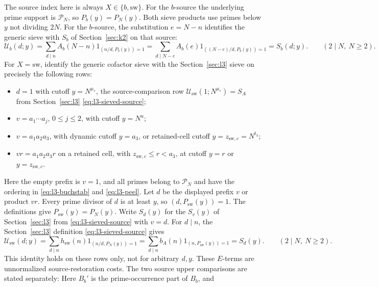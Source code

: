 The source index here is always \(X\in\{b,\mathrm{sw}\}\).
For the $b$-source the underlying prime support is \(\mathcal P_N\), so
\(P_b(y)=P_N(y)\). Both sieve products use primes below $y$ not dividing
$2N$.
For the \(b\)-source, the substitution \(e=N-n\) identifies the
generic sieve with \(S_b\) of Section~\ref{sec:k2} on that source:
\begin{equation}\label{eq:source-ch07-sieve-bridge}
 \mathscr U_b(d;y)
 =\sum_{d\mid n}A_b(N-n)1_{(n/d,P_b(y))=1}
 =\sum_{d\mid N-e}A_b(e)1_{((N-e)/d,P_b(y))=1}
 =S_b(d;y).
\qquad(2\mid N,\ N\ge2).
\end{equation}
For \(X=\mathrm{sw}\), identify the generic cofactor sieve with the
Section~\ref{sec:l3} sieve on precisely the following rows:
\begin{itemize}
\item \(d=1\) with cutoff \(y=N^{\mu_*}\), the source-comparison row
\(\mathscr U_{\mathrm{sw}}(1;N^{\mu_*})=S_A\) from Section~\ref{sec:l3}
\eqref{eq:l3-sieved-source};
\item \(v=a_1\cdots a_j\), \(0\le j\le2\), with cutoff \(y=N^u\);
\item \(v=a_1a_2a_3\), with dynamic cutoff \(y=a_3\), or retained-cell
cutoff \(y=z_{\mathrm{sw},c}=N^{t_3}\);
\item \(vr=a_1a_2a_3r\) on a retained cell, with
\(z_{\mathrm{sw},c}\le r<a_3\), at cutoff \(y=r\) or
\(y=z_{\mathrm{sw},c}\).
\end{itemize}
Here the empty prefix is \(v=1\), and all primes belong to
\(\mathcal P_N\) and have the ordering in \eqref{eq:l3-buchstab}
and \eqref{eq:l3-peel}. Let \(d\) be the displayed prefix \(v\) or
product \(vr\). Every prime divisor of \(d\) is at least \(y\), so
\((d,P_{\mathrm{sw}}(y))=1\). The definitions give
\(P_{\mathrm{sw}}(y)=P_N(y)\). Write \(S_d(y)\) for the \(S_v(y)\) of Section~\ref{sec:l3}
from \eqref{eq:l3-sieved-source} with \(v=d\). For \(d\mid n\), the Section~\ref{sec:l3} definition
\eqref{eq:l3-sieved-source} gives
\begin{equation}\label{eq:source-ch08-sieve-bridge}
 \mathscr U_{\mathrm{sw}}(d;y)
 =\sum_{d\mid n}h_{\mathrm{sw}}(n)1_{(n/d,P_N(y))=1}
 =\sum_{d\mid n}b_A(n)1_{(n,P_{\mathrm{sw}}(y))=1}
 =S_d(y).
\qquad(2\mid N,\ N\ge2).
\end{equation}
This identity holds on these rows only, not for arbitrary \(d,y\).
These \(E\)-terms are unnormalized source-restoration costs. The two
source upper comparisons are stated separately:
Here \(B_b'\) is the prime-occurrence part of \(B_b\), and
